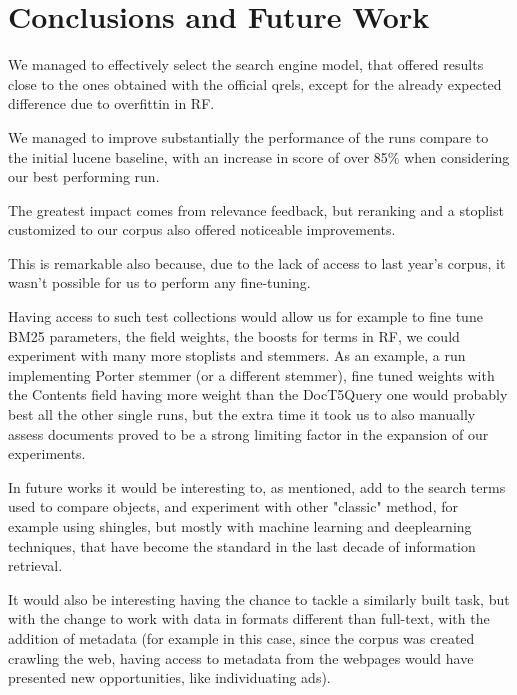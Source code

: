 \section{Conclusions and Future Work}
\label{sec:conclusion}

We managed to effectively select the search engine model, that offered results close to the ones obtained with the official qrels, except for the already expected difference due to overfittin in RF.

We managed to improve substantially the performance of the runs compare to the initial lucene baseline, with an increase in score of over 85\% when considering our best performing run.

The greatest impact comes from relevance feedback, but reranking and a stoplist customized to our corpus also offered noticeable improvements.

This is remarkable also because, due to the lack of access to last year's corpus, it wasn't possible for us to perform any fine-tuning.

Having access to such test collections would allow us for example to fine tune BM25 parameters, the field weights, the boosts for terms in RF, we could experiment with many more stoplists and stemmers.
As an example, a run implementing Porter stemmer (or a different stemmer), fine tuned weights with the Contents field having more weight than the DocT5Query one would probably best all the other single runs, but the extra time it took us to also manually assess documents proved to be a strong limiting factor in the expansion of our experiments.

In future works it would be interesting to, as mentioned, add to the search terms used to compare objects, and experiment with other "classic" method, for example using shingles, but mostly with machine learning and deeplearning techniques, that have become the standard in the last decade of information retrieval.

It would also be interesting having the chance to tackle a similarly built task, but with the change to work with data in formats different than full-text, with the addition of metadata (for example in this case, since the corpus was created crawling the web, having access to metadata from the webpages would have presented new opportunities, like individuating ads).
